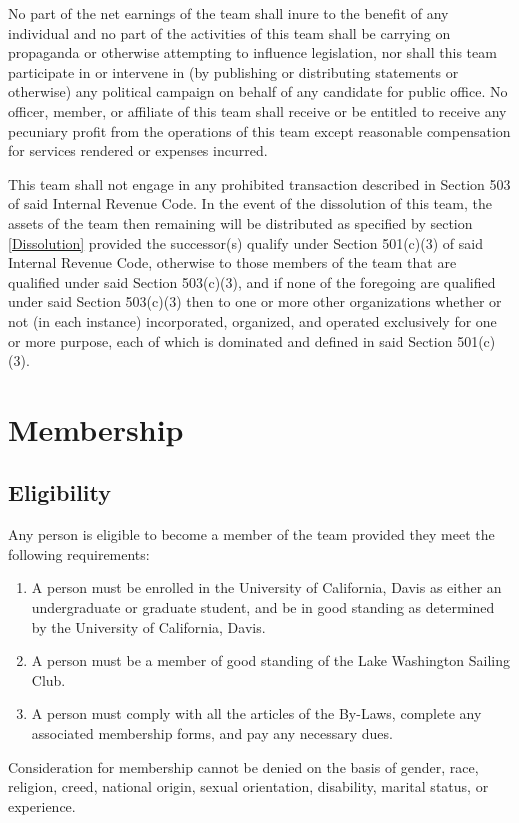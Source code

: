 \documentclass[12pt,titlepage,letter]{article}
\begin{document}
No part of the net earnings of the team shall inure to the benefit of any individual and no part of the activities of this team shall be carrying on propaganda or otherwise attempting to influence legislation, nor shall this team participate in or intervene in (by publishing or distributing statements or otherwise) any political campaign on behalf of any candidate for public office.  No officer, member, or affiliate of this team shall receive or be entitled to receive any pecuniary profit from the operations of this team except reasonable compensation for services rendered or expenses incurred. 

This team shall not engage in any prohibited transaction described in Section 503 of said Internal Revenue Code.  
In the event of the dissolution of this team, the assets of the team then remaining will be distributed as specified by section \ref{Dissolution} provided the successor(s) qualify under Section 501(c)(3) of said Internal Revenue Code, otherwise to those members of the team that are qualified under said Section 503(c)(3), and if none of the foregoing are qualified under said Section 503(c)(3) then to one or more other organizations whether or not (in each instance) incorporated, organized, and operated exclusively for one or more purpose, each of which is dominated and defined in said Section 501(c)(3).

\section{Membership \label{member}}
\subsection{Eligibility \label{member:eligibility}}
Any person is eligible to become a member of the team provided they meet the following requirements:
\begin{enumerate}
\item
A person must be enrolled in the University of California, Davis as either an undergraduate or graduate student, and be in good standing as determined by the University of California, Davis.
\item
A person must be a member of good standing of the Lake Washington Sailing Club.
\item
A person must comply with all the articles of the By-Laws, complete any associated membership forms, and pay any necessary dues.
\end{enumerate}
Consideration for membership cannot be denied on the basis of gender, race, religion, creed, national origin, sexual orientation, disability, marital status, or experience.  
\end{document}

